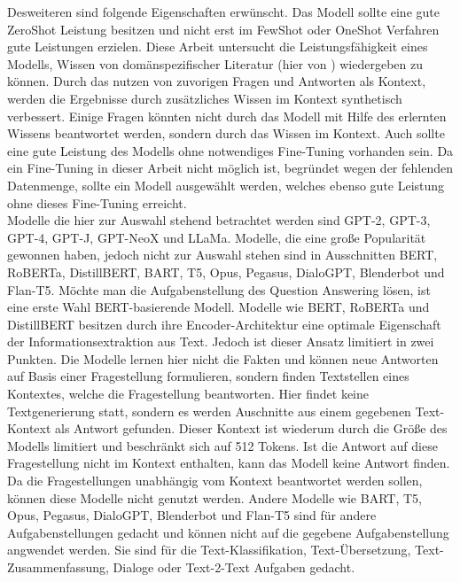 Desweiteren sind folgende Eigenschaften erwünscht. Das Modell sollte eine gute ZeroShot Leistung besitzen und nicht erst im FewShot oder OneShot Verfahren gute Leistungen erzielen.
Diese Arbeit untersucht die Leistungsfähigkeit eines Modells, Wissen von domänspezifischer Literatur (hier von \citet{bb}) wiedergeben zu können.
Durch das nutzen von zuvorigen Fragen und Antworten als Kontext, werden die Ergebnisse durch zusätzliches Wissen im Kontext synthetisch verbessert.
Einige Fragen könnten nicht durch das Modell mit Hilfe des erlernten Wissens beantwortet werden, sondern durch das Wissen im Kontext.
Auch sollte eine gute Leistung des Modells ohne notwendiges Fine-Tuning vorhanden sein.
Da ein Fine-Tuning in dieser Arbeit nicht möglich ist, begründet wegen der fehlenden Datenmenge, sollte ein Modell ausgewählt werden, welches ebenso gute Leistung ohne dieses Fine-Tuning erreicht.\\

Modelle die hier zur Auswahl stehend betrachtet werden sind GPT-2, GPT-3, GPT-4, GPT-J, GPT-NeoX und LLaMa.
Modelle, die eine große Popularität gewonnen haben, jedoch nicht zur Auswahl stehen sind in Ausschnitten BERT, RoBERTa, DistillBERT, BART, T5, Opus, Pegasus, DialoGPT, Blenderbot und Flan-T5.
Möchte man die Aufgabenstellung des Question Answering lösen, ist eine erste Wahl BERT-basierende Modell. 
Modelle wie BERT, RoBERTa und DistillBERT besitzen durch ihre Encoder-Architektur eine optimale Eigenschaft der Informationsextraktion aus Text.
Jedoch ist dieser Ansatz limitiert in zwei Punkten. Die Modelle lernen hier nicht die Fakten und können neue Antworten auf Basis einer Fragestellung formulieren, sondern finden Textstellen eines Kontextes, welche die Fragestellung beantworten.
Hier findet keine Textgenerierung statt, sondern es werden Auschnitte aus einem gegebenen Text-Kontext als Antwort gefunden.
Dieser Kontext ist wiederum durch die Größe des Modells limitiert und beschränkt sich auf 512 Tokens.
Ist die Antwort auf diese Fragestellung nicht im Kontext enthalten, kann das Modell keine Antwort finden. Da die Fragestellungen unabhängig vom Kontext beantwortet werden sollen, können diese Modelle nicht genutzt werden.
Andere Modelle wie BART, T5, Opus, Pegasus, DialoGPT, Blenderbot und Flan-T5 sind für andere Aufgabenstellungen gedacht und können nicht auf die gegebene Aufgabenstellung angwendet werden. Sie sind für die Text-Klassifikation, Text-Übersetzung, Text-Zusammenfassung, Dialoge oder Text-2-Text Aufgaben gedacht.\\

